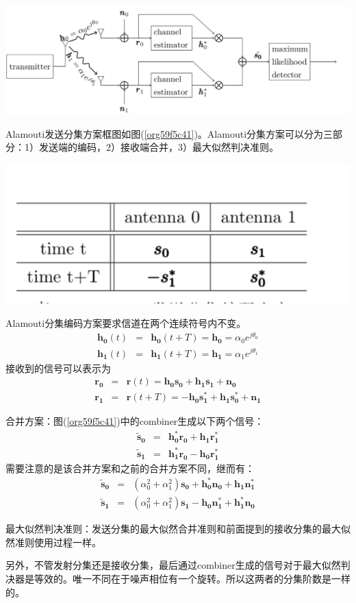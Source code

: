 \documentclass[10pt,a4paper,UTF8]{article}
\begin{document}
\begin{center}
\includegraphics[width=.9\linewidth]{../../img/communication_wireless/20171018alamouti1.png}
\label{org59f5c41}
\end{center}

Alamouti发送分集方案框图如图(\ref{org59f5c41})。Alamouti分集方案可以分为三部分：1）发送端的编码，2）接收端合并，3）最大似然判决准则。

\begin{center}
\includegraphics[width=.9\linewidth]{../../img/communication_wireless/20171018alamouti3.png}
\end{center}


Alamouti分集编码方案要求信道在两个连续符号内不变。
\begin{eqnarray}
  \label{eq:h0th1t}
  \pmb{h_0}(t) &=& \pmb{h_0}(t+T) =  \pmb{h_0}= \alpha_0e^{j\theta_0} \nonumber \\
  \pmb{h_1}(t) &=& \pmb{h_1}(t+T) =  \pmb{h_1}= \alpha_1e^{j\theta_1}
\end{eqnarray}
接收到的信号可以表示为
\begin{eqnarray}
  \label{eq:r0r1}
  \pmb{r_0} &=& \pmb{r}(t) = \pmb{h_0s_0+ h_1s_1+n_0} \nonumber \\
  \pmb{r_1} &=& \pmb{r}(t+T) = \pmb{-h_0s_1^* + h_1s_0^* +n_1}
\end{eqnarray}

合并方案：图(\ref{org59f5c41})中的combiner生成以下两个信号：
\begin{eqnarray}
  \pmb{\tilde{s}_0} &=& \pmb{h_0^* r_0} + \pmb{h_1r_1^*}  \\
  \pmb{\tilde{s}_1} &=& \pmb{h_1^*r_0} -\pmb{h_0r_1^*}
\end{eqnarray}
需要注意的是该合并方案和之前的合并方案不同，继而有：
\begin{eqnarray}
  \pmb{\tilde{s}_0} &=& (\alpha_0^2 + \alpha_1^2) \pmb{s_0} + \pmb{h_0^*n_0} + \pmb{h_1n_1^*}  \\
 \pmb{\tilde{s}_1} &=& (\alpha_0^2 + \alpha_1^2)\pmb{s_1} -\pmb{h_0n_1^*} + \pmb{h_1^*n_0}
\end{eqnarray}

最大似然判决准则：发送分集的最大似然合并准则和前面提到的接收分集的最大似然准则使用过程一样。

另外，不管发射分集还是接收分集，最后通过combiner生成的信号对于最大似然判决器是等效的。唯一不同在于噪声相位有一个旋转。所以这两者的分集阶数是一样的。
\end{document}
